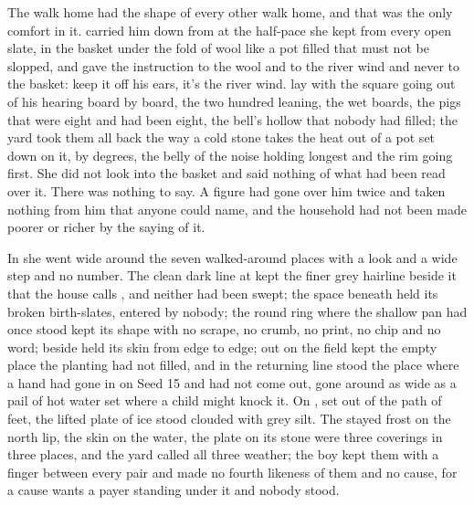 The walk home had the shape of every other walk home, and that was the only comfort in it.  carried him down from  at the half-pace she kept from every open slate, in the basket under the fold of wool like a pot filled that must not be slopped, and gave the instruction to the wool and to the river wind and never to the basket: keep it off his ears, it's the river wind.  lay with the square going out of his hearing board by board, the two hundred leaning, the wet boards, the pigs that were eight and had been eight, the bell's hollow that nobody had filled; the yard took them all back the way a cold stone takes the heat out of a pot set down on it, by degrees, the belly of the noise holding longest and the rim going first. She did not look into the basket and said nothing of what had been read over it. There was nothing to say. A figure had gone over him twice and taken nothing from him that anyone could name, and the household had not been made poorer or richer by the saying of it.

In  she went wide around the seven walked-around places with a look and a wide step and no number. The clean dark line at  kept the finer grey hairline beside it that the house calls , and neither had been swept; the space beneath  held its broken birth-slates, entered by nobody; the round ring where the shallow pan had once stood kept its shape with no scrape, no crumb, no print, no chip and no word;  beside  held its skin from edge to edge; out on  the field kept the empty place the planting had not filled, and in the returning line stood the place where a hand had gone in on Seed 15 and had not come out, gone around as wide as a pail of hot water set where a child might knock it. On , set out of the path of feet, the lifted plate of ice stood clouded with grey silt. The stayed frost on the north lip, the skin on the water, the plate on its stone were three coverings in three places, and the yard called all three weather; the boy kept them with a finger between every pair and made no fourth likeness of them and no cause, for a cause wants a payer standing under it and nobody stood.

